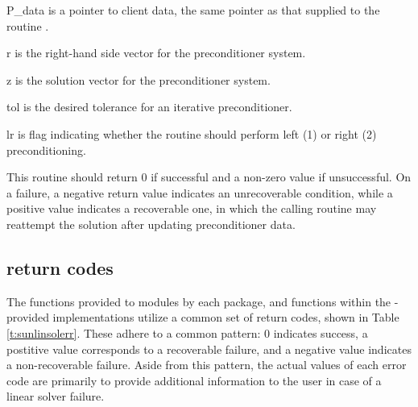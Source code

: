 {
  \begin{args}[P\_data]
  \item[P\_data]
    is a pointer to client data, the same pointer as that supplied to the routine .
  \item[r]
    is the right-hand side vector for the preconditioner system.
  \item[z]
    is the solution vector for the preconditioner system.
  \item[tol]
    is the desired tolerance for an iterative preconditioner.
  \item[lr]
    is flag indicating whether the routine should perform left (1) or
    right (2) preconditioning.
  \end{args}
}
{
  This routine should return 0 if successful and a non-zero value if
  unsuccessful.  On a failure, a negative return value indicates an
  unrecoverable condition, while a positive value indicates a
  recoverable one, in which the calling routine may reattempt the
  solution after updating preconditioner data.
}
{}



\subsection{ return codes}\label{ss:sunlinsol_ErrorCodes}


The functions provided to {\sunlinsol} modules by each {\sundials}
package, and functions within the {\sundials}-provided {\sunlinsol}
implementations utilize a common set of return codes, shown in
Table \ref{t:sunlinsolerr}.  These adhere to a
common pattern: 0 indicates success, a postitive value corresponds to
a recoverable failure, and a negative value indicates a
non-recoverable failure.  Aside from this pattern, the actual values
of each error code are primarily to provide additional information to
the user in case of a linear solver failure.

\newlength{\ColumnOne}
\newlength{\ColumnTwo}
\newlength{\ColumnThree}
\setlength{\ColumnThree}{\textwidth}
\addtolength{\ColumnThree}{-0.5in}
\addtolength{\ColumnThree}{-\ColumnOne}
\addtolength{\ColumnThree}{-\ColumnTwo}

